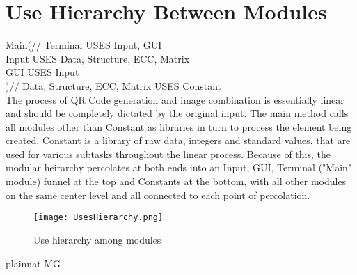 \documentclass[12pt, titlepage]{article}
\begin{document}
\section{Use Hierarchy Between Modules} \label{SecUse}

Main(//
Terminal USES Input, GUI\\
Input USES Data, Structure, ECC, Matrix\\
GUI USES Input\\
)//
Data, Structure, ECC, Matrix USES Constant\\

The process of QR Code generation and image combination is essentially linear 
and should be completely dictated by the original input. The main method calls 
all modules other than Constant as libraries in turn to process the element being
created. Constant is a library of raw data, integers and standard values, that 
are used for various subtasks throughout the linear process. Because of this, the 
modular heirarchy percolates at both ends into an Input, GUI, Terminal ("Main" module) funnel at the top and Constants at 
the bottom, with all other modules on the same center level and all connected 
to each point of percolation.

\begin{figure}[H]
\centering
\texttt{[image: UsesHierarchy.png]}
\caption{Use hierarchy among modules}
\label{FigUH}
\end{figure}


 {plainnat}
 {MG}
\end{document}
